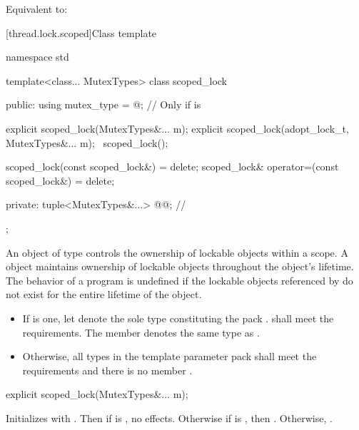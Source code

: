 \begin{itemdescr}
\pnum
\effects
Equivalent to: 
\end{itemdescr}

[thread.lock.scoped]{Class template }

%
\begin{codeblock}
namespace std {
  template<class... MutexTypes>
  class scoped_lock {
  public:
    using mutex_type = @\seebelow@;     // Only if  is 

    explicit scoped_lock(MutexTypes&... m);
    explicit scoped_lock(adopt_lock_t, MutexTypes&... m);
    ~scoped_lock();

    scoped_lock(const scoped_lock&) = delete;
    scoped_lock& operator=(const scoped_lock&) = delete;

  private:
    tuple<MutexTypes&...> @@;   // \expos
  };
}
\end{codeblock}

\pnum
An object of type  controls the ownership of lockable objects
within a scope. A  object maintains ownership of lockable
objects throughout the  object's lifetime.
The behavior of a program is undefined if the lockable objects referenced by
 do not exist for the entire lifetime of the 
object.
\begin{itemize}
\item
If  is one,
let  denote the sole type constituting the pack .
shall meet the  requirements.
The member  
denotes the same type as .
\item
Otherwise, all types in the template parameter pack 
shall meet the  requirements
and there is no member .
\end{itemize}

%
\begin{itemdecl}
explicit scoped_lock(MutexTypes&... m);
\end{itemdecl}

\begin{itemdescr}
\pnum
\effects
Initializes  with .
Then if  is , no effects.
Otherwise if  is , then .
Otherwise, .
\end{itemdescr}

